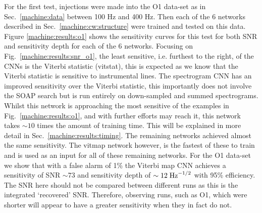 For the first test, injections were made into the O1 data-set as in Sec.~\ref{machine:data} between 100 Hz and 400 Hz. Then each of the 6 networks described in Sec.~\ref{machine:cw:structure} were trained and tested on this data. 
Figure \ref{machine:results:o1} shows the sensitivity curves for this test for both \gls{SNR} and sensitivity depth for each of the 6 networks. Focusing on Fig.~\ref{machine:results:snr_o1}, the least sensitive, i.e. furthest to the right, of the \glspl{CNN} is the Viterbi statistic (vitstat), this is expected as we know that the Viterbi statistic is sensitive to instrumental lines. 
The spectrogram \gls{CNN} has an improved sensitivity over the Viterbi statistic, this importantly does not involve the SOAP search but is run entirely on down-sampled and summed spectrograms. 
Whilst this network is approaching the most sensitive of the examples in Fig.~\ref{machine:results:o1}, and with further efforts may reach it, this network takes $\sim10$ times the amount of training time. This will be explained in more detail in Sec.~\ref{machine:results:timing}.
The remaining networks achieved almost the same sensitivity. 
The vitmap network however, is the fastest of these to train and is used as an input for all of these remaining networks.
For the O1 data-set we show that with a false alarm of 1\% the Viterbi map \gls{CNN} achieves a sensitivity of SNR $\sim 73$ and sensitivity depth of $\sim 12\; {\rm Hz}^{-1/2}$ with 95\% efficiency.
The \gls{SNR} here should not be compared between different runs as this is the integrated `recovered' \gls{SNR}. Therefore, observing runs, such as O1, which were shorter will appear to have a greater sensitivity when they in fact do not. 

